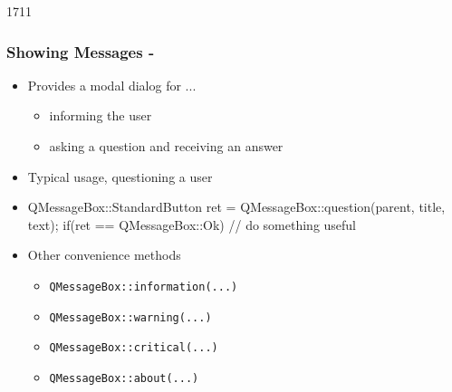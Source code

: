\begin{slide}[fragile]{1711}
  \frametitle{Showing Messages - }
\begin{itemize}
\item Provides a modal dialog for ...
  \begin{itemize}
  \item informing the user
  \item asking a question and receiving an answer
  \end{itemize}

  \item Typical usage, questioning a user
  \item[]
    \begin{cpp}
QMessageBox::StandardButton ret = 
   QMessageBox::question(parent, title, text);
if(ret == QMessageBox::Ok) {
  // do something useful
}
    \end{cpp}
  \item Other convenience methods
    \begin{itemize}
    \item \texttt{QMessageBox::information(...)}
    \item \texttt{QMessageBox::warning(...)}
    \item \texttt{QMessageBox::critical(...)}
    \item \texttt{QMessageBox::about(...)}
   \end{itemize}
 \end{itemize}
\end{slide}



